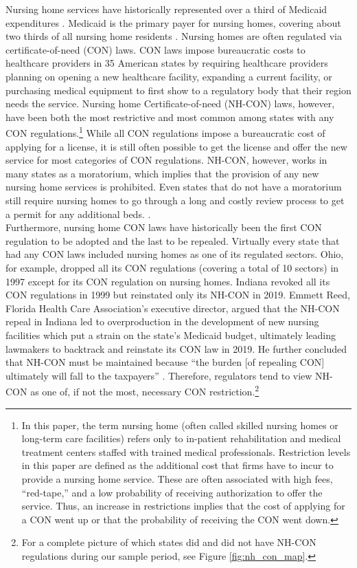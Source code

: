 \documentclass[../Main.tex]{subfiles}
\begin{document}
Nursing home services have historically represented over a third of Medicaid expenditures \citep{wiener1999controlling}. Medicaid is the primary payer for nursing homes, covering about two thirds of all nursing home residents . Nursing homes are often regulated via certificate-of-need (CON) laws. CON laws impose bureaucratic costs to healthcare providers in 35 American states by requiring healthcare providers planning on opening a new healthcare facility, expanding a current facility, or purchasing medical equipment to first show to a regulatory body that their region needs the service. Nursing home Certificate-of-need (NH-CON) laws, however, have been both the most restrictive and most common among states with any CON regulations.\footnote{In this paper, the term nursing home (often called skilled nursing homes or long-term care facilities) refers only to in-patient rehabilitation and medical treatment centers staffed with trained medical professionals. Restriction levels in this paper are defined as the additional cost that firms have to incur to provide a nursing home service. These are often associated with high fees, ``red-tape,'' and a low probability of receiving authorization to offer the service. Thus, an increase in restrictions implies that the cost of applying for a CON went up or that the probability of receiving the CON went down.} While all CON regulations impose a bureaucratic cost of applying for a license, it is still often possible to get the license and offer the new service for most categories of CON regulations.  NH-CON, however, works in many states as a moratorium, which implies that the provision of any new nursing home services is prohibited. Even states that do not have a moratorium still require nursing homes to go through a long and costly review process to get a permit for any additional beds. \citep{american2020american}.\\
\indent Furthermore, nursing home CON laws have historically been the first CON regulation to be adopted and the last to be repealed. Virtually every state that had any CON laws included nursing homes as one of its regulated sectors. Ohio, for example, dropped all its CON regulations (covering a total of 10 sectors) in 1997 except for its CON regulation on nursing homes. Indiana revoked all its CON regulations in 1999 but reinstated only its NH-CON in 2019. Emmett Reed, Florida Health Care Association’s executive director, argued that the NH-CON repeal in Indiana led to overproduction in the development of new nursing facilities which put a strain on the state’s Medicaid budget, ultimately leading lawmakers to backtrack and reinstate its CON law in 2019. He further concluded that NH-CON must be maintained because “the burden [of repealing CON] ultimately will fall to the taxpayers” \citep{sexton2019conrepeal}. Therefore, regulators tend to view NH-CON as one of, if not the most, necessary CON restriction.\footnote{For a complete picture of which states did and did not have NH-CON regulations during our sample period, see Figure \ref{fig:nh_con_map}.}\\
\end{document}
